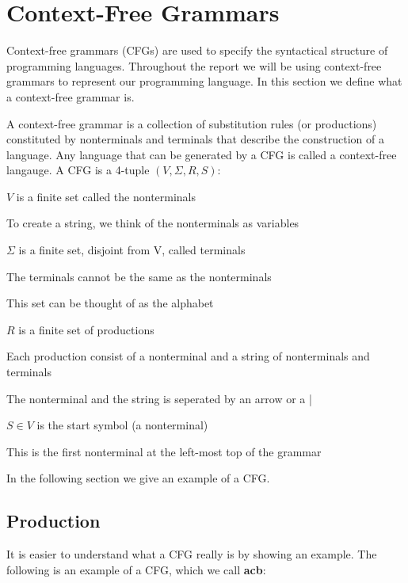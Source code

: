 \section{Context-Free Grammars}
\label{sec:cfg}
Context-free grammars (CFGs) are used to specify the syntactical structure of programming languages. Throughout the report we will be using context-free grammars to represent our programming language. In this section we define what a context-free grammar is. 

A context-free grammar is a collection of substitution rules (or productions) constituted by nonterminals and terminals that describe the construction of a language. Any language that can be generated by a CFG is called a context-free langauge. A CFG is a 4-tuple $(V, \Sigma, R, S)$:\cite[p. 100]{itttoc}

\begin{dlist}
\item $V$ is a finite set called the nonterminals
\begin{dlist}
\item To create a string, we think of the nonterminals as variables
\end{dlist}
\item $\Sigma$ is a finite set, disjoint from V, called terminals
\begin{dlist}
\item The terminals cannot be the same as the nonterminals
\item This set can be thought of as the alphabet
\end{dlist}
\item $R$ is a finite set of productions
\begin{dlist}
\item Each production consist of a nonterminal and a string of nonterminals and terminals
\item The nonterminal and the string is seperated by an arrow or a |
\end{dlist}
\item $S \in V$ is the start symbol (a nonterminal)
\begin{dlist}
\item This is the first nonterminal at the left-most top of the grammar
\end{dlist}
\end{dlist} 

In the following section we give an example of a CFG.

\subsection{Production}
It is easier to understand what a CFG really is by showing an example. The following is an example of a CFG, which we call \textbf{acb}:


